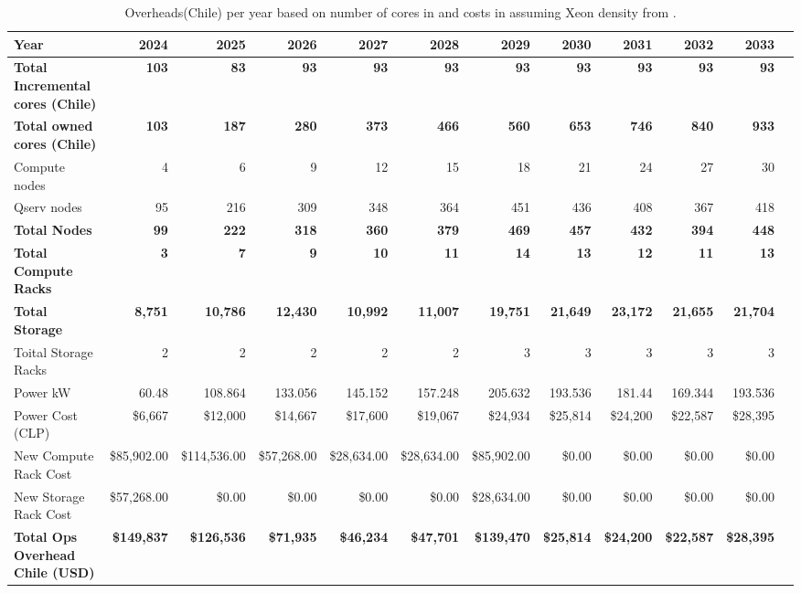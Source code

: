 \tiny \begin{longtable} { |p{}  |r  |r  |r  |r  |r  |r  |r  |r  |r  |r  |r |} 
\caption{Overheads(Chile) per year based on number of cores in  and costs in  assuming Xeon density from .  \label{tab:opsOverheadChile}}\\ 
\hline 
\textbf{Year}&\textbf{2024}&\textbf{2025}&\textbf{2026}&\textbf{2027}&\textbf{2028}&\textbf{2029}&\textbf{2030}&\textbf{2031}&\textbf{2032}&\textbf{2033} \\ \hline
\textbf{Total Incremental cores (Chile)}&\textbf{103}&\textbf{83}&\textbf{93}&\textbf{93}&\textbf{93}&\textbf{93}&\textbf{93}&\textbf{93}&\textbf{93}&\textbf{93} \\ \hline
\textbf{Total owned cores (Chile)}&\textbf{103}&\textbf{187}&\textbf{280}&\textbf{373}&\textbf{466}&\textbf{560}&\textbf{653}&\textbf{746}&\textbf{840}&\textbf{933} \\ \hline
{Compute nodes}&{4}&{6}&{9}&{12}&{15}&{18}&{21}&{24}&{27}&{30} \\ \hline
{Qserv nodes}&{95}&{216}&{309}&{348}&{364}&{451}&{436}&{408}&{367}&{418} \\ \hline
\textbf{Total Nodes}&\textbf{99}&\textbf{222}&\textbf{318}&\textbf{360}&\textbf{379}&\textbf{469}&\textbf{457}&\textbf{432}&\textbf{394}&\textbf{448} \\ \hline
\textbf{Total Compute Racks}&\textbf{3}&\textbf{7}&\textbf{9}&\textbf{10}&\textbf{11}&\textbf{14}&\textbf{13}&\textbf{12}&\textbf{11}&\textbf{13} \\ \hline
\textbf{Total Storage}&\textbf{8,751}&\textbf{10,786}&\textbf{12,430}&\textbf{10,992}&\textbf{11,007}&\textbf{19,751}&\textbf{21,649}&\textbf{23,172}&\textbf{21,655}&\textbf{21,704} \\ \hline
{Toital Storage Racks}&{2}&{2}&{2}&{2}&{2}&{3}&{3}&{3}&{3}&{3} \\ \hline
{Power kW
}&{60.48}&{108.864}&{133.056}&{145.152}&{157.248}&{205.632}&{193.536}&{181.44}&{169.344}&{193.536} \\ \hline
{Power Cost (CLP)}&{\$6,667}&{\$12,000}&{\$14,667}&{\$17,600}&{\$19,067}&{\$24,934}&{\$25,814}&{\$24,200}&{\$22,587}&{\$28,395} \\ \hline
{New Compute Rack Cost}&{\$85,902.00}&{\$114,536.00}&{\$57,268.00}&{\$28,634.00}&{\$28,634.00}&{\$85,902.00}&{\$0.00}&{\$0.00}&{\$0.00}&{\$0.00} \\ \hline
{New Storage Rack Cost}&{\$57,268.00}&{\$0.00}&{\$0.00}&{\$0.00}&{\$0.00}&{\$28,634.00}&{\$0.00}&{\$0.00}&{\$0.00}&{\$0.00} \\ \hline
\textbf{Total Ops Overhead Chile (USD)}&\textbf{\$149,837}&\textbf{\$126,536}&\textbf{\$71,935}&\textbf{\$46,234}&\textbf{\$47,701}&\textbf{\$139,470}&\textbf{\$25,814}&\textbf{\$24,200}&\textbf{\$22,587}&\textbf{\$28,395} \\ \hline
\end{longtable} \normalsize
